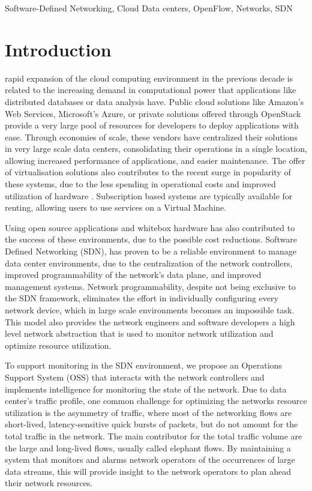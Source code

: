 \documentclass[a4paper]{IEEEtran}
\begin{document}
\begin{IEEEkeywords}
Software-Defined Networking, Cloud Data centers, OpenFlow, Networks, SDN
\end{IEEEkeywords}

\section{Introduction}

 rapid expansion of the cloud computing environment in the previous decade is related to the increasing demand in computational power that 
applications like distributed databases or data analysis have. Public cloud solutions like Amazon's Web Services, Microsoft's Azure, or private solutions offered
through OpenStack provide a very large pool of resources for developers to deploy applications with ease. Through economies of scale, these vendors have
centralized their solutions in very large scale data centers, consolidating their operations in a single location, allowing increased performance of applications, and
easier maintenance. The offer of virtualisation solutions also contributes to the recent surge in popularity of these systems, due to the less spending in
operational costs and improved utilization of hardware \cite{sims_david_carousels_2011}. Subscription based systems are typically available for renting, allowing 
users to use services on a Virtual Machine.

\par Using open source applications and whitebox hardware has also contributed to the success of these environments, due to the possible cost reductions. Software
Defined Networking (SDN), has proven to be a reliable environment to manage data center environments, due to the centralization of the network
controllers, improved programmability of the network's data plane, and improved management systems. Network programmability, despite not being exclusive to the 
SDN framework, eliminates the effort in individually configuring every network device, which in large scale environments becomes an impossible task. This model
also provides the network engineers and software developers a high level network abstraction that is used to monitor network utilization and optimize resource
utilization.

\par To support monitoring in the SDN environment, we propose an Operations Support System (OSS) that interacts with the network controllers and implements 
intelligence for monitoring the state of the network. Due to data center's traffic profile, one common challenge for optimizing the networks resource utilization
is the asymmetry of traffic, where most of the networking flows are short-lived, latency-sensitive quick bursts of packets, but do not amount for the total traffic 
in the network. The main contributor for the total traffic volume are the large and long-lived flows, usually called elephant flows. By maintaining a system that
monitors and alarms network operators of the occurrences of large data streams, this will provide insight to the network operators to plan ahead their network 
resources.
\end{document}
